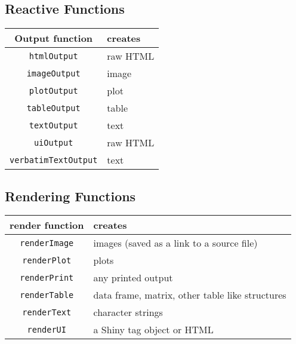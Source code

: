 \documentclass[a4paper,12pt]{article}
\begin{document}
\subsection*{Reactive Functions}
\begin{center}
\begin{tabular}{|c|l|}
\hline  Output function	& creates  \\ \hline  \hline

\texttt{htmlOutput}	& raw HTML \\ \hline
\texttt{imageOutput}	& image \\ \hline
\texttt{plotOutput}	& plot \\ \hline
\texttt{tableOutput}	& table \\ \hline
\texttt{textOutput}	& text \\ \hline
\texttt{uiOutput}	& raw HTML \\ \hline
\texttt{verbatimTextOutput}	& text \\ \hline
\end{tabular} 
\end{center}






\subsection*{Rendering Functions}

\begin{center}
\begin{tabular}{|c|l|}
\hline
render function	& creates  \\ \hline  \hline
\texttt{renderImage}	& images (saved as a link to a source file)  \\ \hline 
\texttt{renderPlot}	& plots \\ \hline 
\texttt{renderPrint}	& any printed output \\ \hline 
\texttt{renderTable}	& data frame, matrix, other table like structures \\ \hline 
\texttt{renderText}	& character strings \\ \hline 
\texttt{renderUI}	& a Shiny tag object or HTML \\ \hline 
\end{tabular} 
\end{center}

\end{document}
